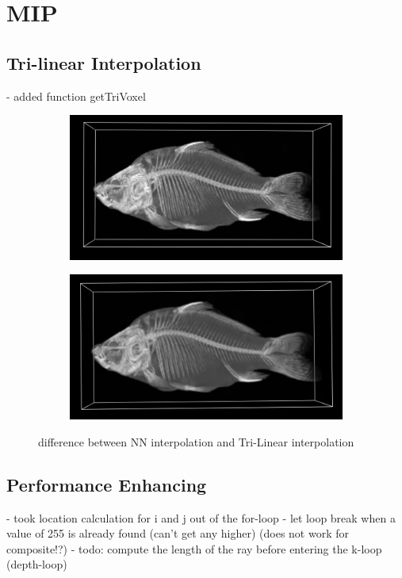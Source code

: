 \section{MIP}\label{sec:mip}

\subsection{Tri-linear Interpolation}\label{sec:tri_linear}
- added function getTriVoxel

\begin{figure}[h!]
    \centering
    \captionsetup{justification=centering,margin=0.5cm}
    \begin{subfigure}[t]{0.48\textwidth}
        \includegraphics[width=\textwidth]{img/fish_NN.png}
        \caption{ }
    \end{subfigure}
    \begin{subfigure}[t]{0.48\textwidth}
        \includegraphics[width=\textwidth]{img/fish_TriLin.png}
        \caption{ }
    \end{subfigure}
    \caption{difference between NN interpolation and Tri-Linear interpolation}
    \label{fig:trilinear}
\end{figure}

\subsection{Performance Enhancing}\label{sec:perf_enh}

- took location calculation for i and j out of the for-loop
- let loop break when a value of 255 is already found (can't get any higher) (does not work for composite!?)
- todo: compute the length of the ray before entering the k-loop (depth-loop)
